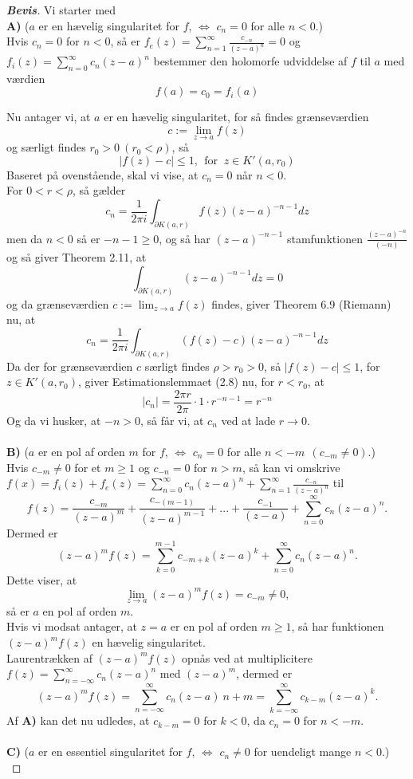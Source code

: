 \documentclass[10pt,a4paper]{article}
\theoremstyle{definition}
\begin{document}
\newpage
\begin{proof}[\textbf{Bevis}]
Vi starter med\\
\textbf{A)} ($a$ er en hævelig singularitet for $f$, $\Leftrightarrow$ $c_n=0$ for alle $n<0$.)\\

Hvis $c_n=0$ for $n<0$, så er $f_e(z)=\sum\limits_{n=1}^\infty \frac{c_{-n}}{(z-a)^n}=0$ og $f_i(z)=\sum\limits_{n=0}^\infty c_n (z-a)^n$ bestemmer den holomorfe udviddelse af $f$ til $a$ med værdien
$$f(a) = c_0 = f_i(a)$$ 

Nu antager vi, at $a$ er en hævelig singularitet, for så findes grænseværdien
$$c := \lim_{z \rightarrow a} f(z)$$
og særligt findes $r_0 > 0 \ (r_0 < \rho)$, så
$$|f(z) -c| \leq 1, \ \ \text{for } \ z \in K'(a,r_0)$$
Baseret på ovenstående, skal vi vise, at $c_n = 0$ når $n<0$. \\
For $0<r<\rho$, så gælder
$$c_n = \frac{1}{2\pi i} \int_{\partial K(a,r)} f(z) (z-a)^{-n-1}dz$$
men da $n<0$ så er $-n-1 \geq 0$, og så har $(z-a)^{-n-1}$ stamfunktionen $\frac{(z-a)^{-n}}{(-n)}$ og så giver Theorem 2.11, at
$$\int_{\partial K(a,r)} (z-a)^{-n-1} dz= 0$$
og da grænseværdien $c := \lim_{z \rightarrow a} f(z)$ findes, giver Theorem 6.9 (Riemann) nu, at
$$c_n = \frac{1}{2 \pi i} \int_{\partial K(a,r)} (f(z)-c)(z-a)^{-n-1}dz$$
Da der for grænseværdien $c$ særligt findes $\rho>r_0>0$, så $|f(z)-c| \leq 1$, for $z \in K'(a,r_0)$, giver Estimationslemmaet (2.8) nu, for $r<r_0$, at
$$|c_n| = \frac{2\pi r}{2 \pi} \cdot 1 \cdot r^{-n-1} = r^{-n}$$
Og da vi husker, at $-n>0$, så får vi, at $c_n$ ved at lade $r \rightarrow 0$. \\
\\
\textbf{B)} ($a$ er en pol af orden $m$ for $f$, $\Leftrightarrow$ $c_n=0$ for alle $n < -m \ \ (c_{-m} \neq 0)$.)\\

Hvis $c_{-m}\neq 0$ for et $m\geq1$ og $c_{-n}=0$ for $n>m$, så kan vi omskrive $f(x)=f_i(z)+f_e(z)= \sum\limits_{n=0}^\infty c_n (z-a)^n + \sum\limits_{n=1}^\infty \frac{c_{-n}}{(z-a)^n}$ til 
$$f(z) = \frac{c_{-m}}{(z-a)^m} + \frac{c_{-(m-1)}}{(z-a)^{m-1}} + ... + \frac{c_{-1}}{(z-a)} + \sum\limits_{n=0}^\infty c_n (z-a)^n.$$
Dermed er
$$(z-a)^m f(z) = \sum\limits_{k=0}^{m-1} c_{-m+k}(z-a)^k + \sum\limits_{n=0}^\infty c_n(z-a)^n.$$
Dette viser, at 
$$\lim_{z \rightarrow a} (z-a)^m f(z) = c_{-m} \neq 0,$$
så er $a$ en pol af orden $m$.  \\

Hvis vi modsat antager, at $z=a$ er en pol af orden $m \geq 1$, så har funktionen $(z-a)^m f(z)$ en hævelig singularitet. \\
Laurentrækken af $(z-a)^m f(z)$ opnås ved at multiplicitere $f(z) = \sum\limits_{n=-\infty}^\infty c_n(z-a)^n$ med $(z-a)^m$, dermed er
$$(z-a)^m f(z) = \sum\limits_{n=-\infty}^\infty c_n (z-a)~{n+m} = \sum\limits_{k=-\infty}^\infty c_{k-m}(z-a)^k.$$
Af \textbf{A)} kan det nu udledes, at $c_{k-m} = 0$ for $k<0$, da $c_n = 0$ for $n<-m$. \\
\\
\textbf{C)} ($a$ er en essentiel singularitet for $f$, $\Leftrightarrow$ $c_n \neq 0$ for uendeligt mange $n<0$.) \\


\end{proof}
\end{document}
